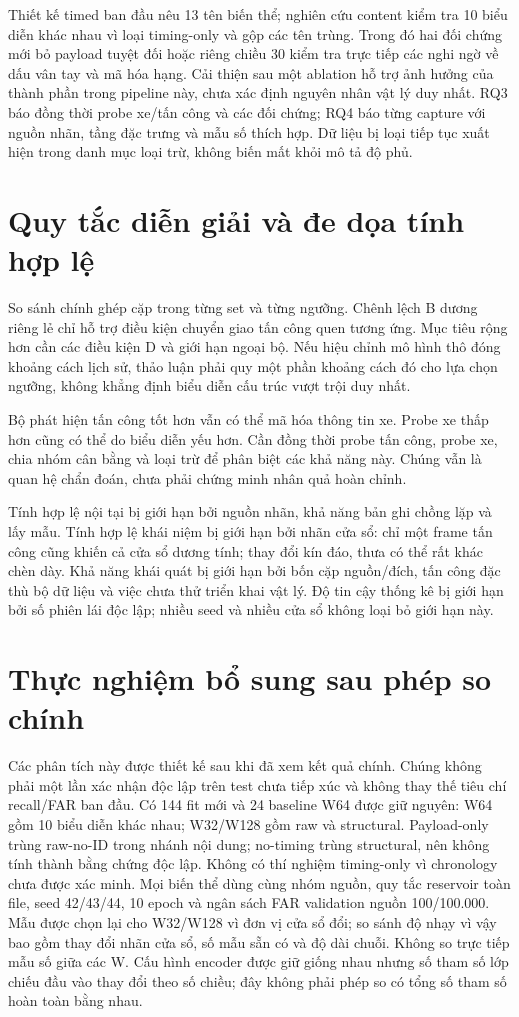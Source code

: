 \documentclass[12pt,a4paper,oneside,openany]{extbook}
\begin{document}
Thiết kế timed ban đầu nêu 13 tên biến thể; nghiên cứu content kiểm tra 10 biểu diễn khác nhau vì loại timing-only và gộp các tên trùng. Trong đó hai đối chứng mới bỏ payload tuyệt đối hoặc riêng chiều 30 kiểm tra trực tiếp các nghi ngờ về dấu vân tay và mã hóa hạng. Cải thiện sau một ablation hỗ trợ ảnh hưởng của thành phần trong pipeline này, chưa xác định nguyên nhân vật lý duy nhất. RQ3 báo đồng thời probe xe/tấn công và các đối chứng; RQ4 báo từng capture với nguồn nhãn, tầng đặc trưng và mẫu số thích hợp. Dữ liệu bị loại tiếp tục xuất hiện trong danh mục loại trừ, không biến mất khỏi mô tả độ phủ.

\section{Quy tắc diễn giải và đe dọa tính hợp lệ}
So sánh chính ghép cặp trong từng set và từng ngưỡng. Chênh lệch B dương riêng lẻ chỉ hỗ trợ điều kiện chuyển giao tấn công quen tương ứng. Mục tiêu rộng hơn cần các điều kiện D và giới hạn ngoại bộ. Nếu hiệu chỉnh mô hình thô đóng khoảng cách lịch sử, thảo luận phải quy một phần khoảng cách đó cho lựa chọn ngưỡng, không khẳng định biểu diễn cấu trúc vượt trội duy nhất.

Bộ phát hiện tấn công tốt hơn vẫn có thể mã hóa thông tin xe. Probe xe thấp hơn cũng có thể do biểu diễn yếu hơn. Cần đồng thời probe tấn công, probe xe, chia nhóm cân bằng và loại trừ để phân biệt các khả năng này. Chúng vẫn là quan hệ chẩn đoán, chưa phải chứng minh nhân quả hoàn chỉnh.

Tính hợp lệ nội tại bị giới hạn bởi nguồn nhãn, khả năng bản ghi chồng lặp và lấy mẫu. Tính hợp lệ khái niệm bị giới hạn bởi nhãn cửa sổ: chỉ một frame tấn công cũng khiến cả cửa sổ dương tính; thay đổi kín đáo, thưa có thể rất khác chèn dày. Khả năng khái quát bị giới hạn bởi bốn cặp nguồn/đích, tấn công đặc thù bộ dữ liệu và việc chưa thử triển khai vật lý. Độ tin cậy thống kê bị giới hạn bởi số phiên lái độc lập; nhiều seed và nhiều cửa sổ không loại bỏ giới hạn này.
\section{Thực nghiệm bổ sung sau phép so chính}\label{sec:completion}
Các phân tích này được thiết kế sau khi đã xem kết quả chính. Chúng không phải một lần xác nhận độc lập trên test chưa tiếp xúc và không thay thế tiêu chí recall/FAR ban đầu. Có 144 fit mới và 24 baseline W64 được giữ nguyên: W64 gồm 10 biểu diễn khác nhau; W32/W128 gồm raw và structural. Payload-only trùng raw-no-ID trong nhánh nội dung; no-timing trùng structural, nên không tính thành bằng chứng độc lập. Không có thí nghiệm timing-only vì chronology chưa được xác minh.
Mọi biến thể dùng cùng nhóm nguồn, quy tắc reservoir toàn file, seed 42/43/44, 10 epoch và ngân sách FAR validation nguồn 100/100.000. Mẫu được chọn lại cho W32/W128 vì đơn vị cửa sổ đổi; so sánh độ nhạy vì vậy bao gồm thay đổi nhãn cửa sổ, số mẫu sẵn có và độ dài chuỗi. Không so trực tiếp mẫu số giữa các W.
Cấu hình encoder được giữ giống nhau nhưng số tham số lớp chiếu đầu vào thay đổi theo số chiều; đây không phải phép so có tổng số tham số hoàn toàn bằng nhau.
\end{document}
